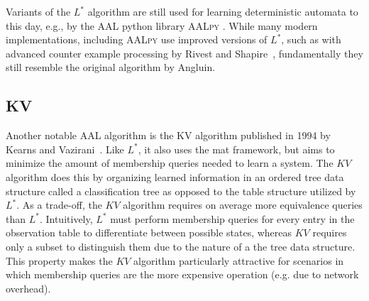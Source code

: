 Variants of the $L^*$ algorithm are still used for learning deterministic automata to this day, e.g., by the AAL python library \textsc{AALpy} \cite{software:aalpy}. While many modern implementations, including \textsc{AALpy} use improved versions of $L^*$, such as with advanced counter example processing by Rivest and Shapire~\cite{Rivest1993Inference}, fundamentally they still resemble the original algorithm by Angluin. 

 
\subsection{KV}
Another notable AAL algorithm is the KV algorithm published in 1994 by Kearns and Vazirani~\cite{KV1994}. Like $L^*$, it also uses the \ac{mat} framework, but aims to minimize the amount of membership queries needed to learn a system. The $KV$ algorithm does this by organizing learned information in an ordered tree data structure called a classification tree as opposed to the table structure utilized by $L^*$. As a trade-off, the $KV$ algorithm requires on average more equivalence queries than $L^*$. Intuitively, $L^*$ must perform membership queries for every entry in the observation table to differentiate between possible states, whereas $KV$ requires only a subset to distinguish them due to the nature of a the tree data structure. This property makes the $KV$ algorithm particularly attractive for scenarios in which membership queries are the more expensive operation (e.g. due to network overhead).

